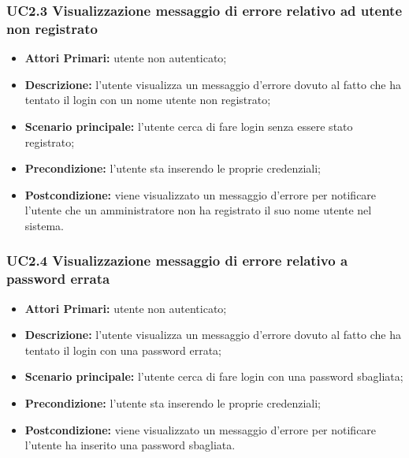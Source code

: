 \subsubsection{UC2.3 Visualizzazione messaggio di errore relativo ad utente non registrato}
\begin{itemize}
	\item \textbf{Attori Primari:} utente non autenticato;
	\item \textbf{Descrizione:} l'utente visualizza un messaggio d'errore dovuto al fatto che ha tentato il login con un nome utente non registrato;
	\item \textbf{Scenario principale:} l'utente cerca di fare login senza essere stato registrato;
	\item \textbf{Precondizione:} l'utente sta inserendo le proprie credenziali;
	\item \textbf{Postcondizione:} viene visualizzato un messaggio d'errore per notificare l'utente che un amministratore non ha registrato il suo nome utente nel sistema.
\end{itemize}

\subsubsection{UC2.4 Visualizzazione messaggio di errore relativo a password errata}
\begin{itemize}
	\item \textbf{Attori Primari:} utente non autenticato;
	\item \textbf{Descrizione:} l'utente visualizza un messaggio d'errore dovuto al fatto che ha tentato il login con una password errata;
	\item \textbf{Scenario principale:} l'utente cerca di fare login con una password sbagliata;
	\item \textbf{Precondizione:} l'utente sta inserendo le proprie credenziali;
	\item \textbf{Postcondizione:} viene visualizzato un messaggio d'errore per notificare l'utente ha inserito una password sbagliata.
\end{itemize}



